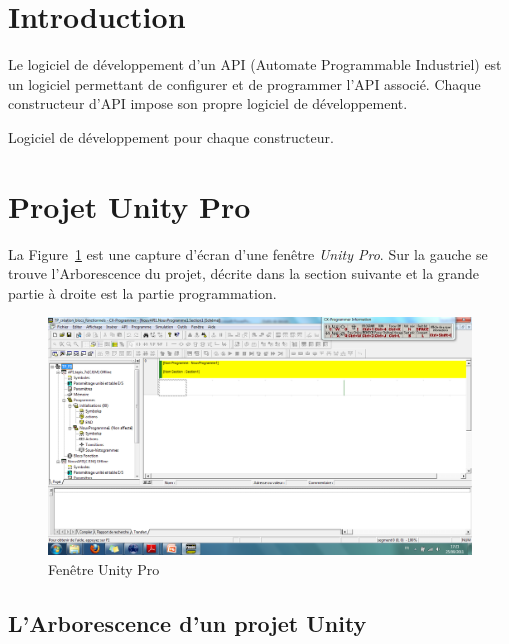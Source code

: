 \documentclass[11pt]{article}
\begin{document}
\UPSTIbuildPage
\section*{Introduction}
Le logiciel de développement d'un API (Automate Programmable Industriel) est un logiciel permettant de configurer et de programmer l'API associé. Chaque constructeur d'API  impose son propre logiciel de développement.

\begin{table}[ht]
\centering
	
	\caption{Logiciel de développement pour chaque constructeur.}
\end{table}

\section{Projet Unity Pro}

La Figure~\ref{fig:unity_fenetre} est une capture d'écran d'une fenêtre \textit{Unity Pro}. Sur la gauche se trouve l'Arborescence du projet, décrite dans la section suivante et la grande partie à droite est la partie programmation.

\begin{figure}[hbt]
	\centering
	\includegraphics[trim = 0mm 15mm 0mm 0mm, clip,width=.7\linewidth]{images/unity_arbo}
	\caption{Fenêtre Unity Pro}
	\label{fig:unity_fenetre}
\end{figure}

\subsection{L'Arborescence d'un projet Unity}
\end{document}
